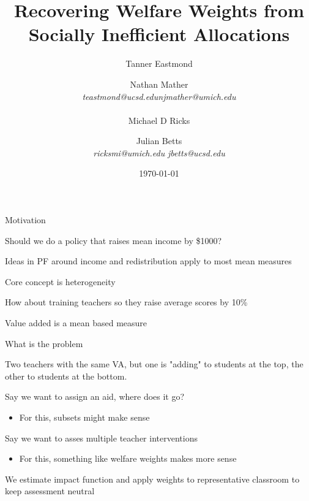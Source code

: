 \documentclass[t,aspectratio=169,11pt,presentation]{beamer}
\title{Recovering Welfare Weights from Socially Inefficient Allocations}
\author{Tanner Eastmond \hfill \and Nathan Mather    \\   \textit{teastmond@ucsd.edu}\hfill \textit{njmather{\fontfamily{qag}\selectfont @}umich.edu} \\ {\color{white}{t}} \\  Michael D Ricks  \and \hfill  Julian Betts \\
\textit{ricksmi{\fontfamily{qag}\selectfont @}umich.edu} \hfill \textit{jbetts@ucsd.edu}}
\institute{}
\date{\today}
\newenvironment{wideitemize}{\itemize\addtolength{\itemsep}{14pt}}{\enditemize}
\begin{document}
\begin{frame}[noframenumbering]
\titlepage 
\end{frame}





\begin{frame}{Motivation}
\begin{wideitemize}
    \item Should we do a policy that raises mean income by \$1000? 
    \item Ideas in PF around income and redistribution apply to most mean measures
    
    \item Core concept is heterogeneity 
    
    \item How about training teachers so they raise average scores by 10\%

    \item Value added is a mean based measure 
    
\end{wideitemize}

\end{frame}


\begin{frame}{What is the problem}
\begin{wideitemize}
    \item Two teachers with the same VA, but one is "adding" to students at the top, the other to students at the bottom. 
    \item Say we want to assign an aid, where does it go? 
    \begin{itemize}
        \item For this, subsets might make sense 
    \end{itemize}
    \item Say we want to asses multiple teacher interventions
    \begin{itemize}
        \item For this, something like welfare weights makes more sense 
    \end{itemize}
    \item We estimate impact function and apply weights to representative classroom to keep assessment neutral 
\end{wideitemize}
\end{frame}
\end{document}
